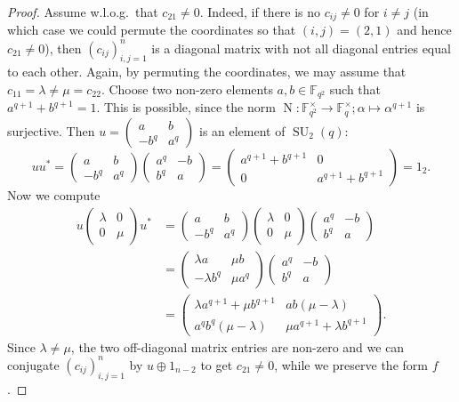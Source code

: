 \documentclass[a4paper,11pt]{amsproc}
\newcommand{\finfield}{\mathbb{F}}%
\DeclareMathOperator{\SU}{SU}%
\DeclareMathOperator{\N}{N}%
\theoremstyle{plain}
\theoremstyle{definition}
\begin{document}
	\begin{proof}
		Assume w.l.o.g.\ that $c_{21}\neq 0$. Indeed, if there is no $c_{ij}\neq 0$ for $i\neq j$ (in which case we could permute the coordinates so that $(i,j)=(2,1)$ and hence $c_{21}\neq 0$), then $(c_{ij})_{i,j=1}^n$ is a diagonal matrix with not all diagonal entries equal to each other. Again, by permuting the coordinates, we may assume that $c_{11}=\lambda\neq\mu=c_{22}$. Choose two non-zero elements $a,b\in\finfield_{q^2}$ such that $a^{q+1}+b^{q+1}=1$. This is possible, since the norm $\N\colon\finfield_{q^2}^\times\to\finfield_q^\times;\alpha\mapsto\alpha^{q+1}$ is surjective. Then $u=\left(\begin{smallmatrix} a & b\\ -b^q & a^q\end{smallmatrix}\right)$ is an element of $\SU_2(q)$: 
		$$
		uu^\ast=\begin{pmatrix} a & b\\ -b^q & a^q\end{pmatrix}\begin{pmatrix} a^q & -b\\ b^q & a\end{pmatrix}=\begin{pmatrix} a^{q+1}+b^{q+1} & 0\\ 0 & a^{q+1}+b^{q+1}\end{pmatrix}=1_2.
		$$
		Now we compute
		\begin{align*}
			u
			\begin{pmatrix}
				\lambda & 0\\
				0 & \mu
			\end{pmatrix}
			u^\ast
			&=
			\begin{pmatrix} 
				a & b\\ 
				-b^q & a^q
			\end{pmatrix}
			\begin{pmatrix}
				\lambda & 0\\
				0 & \mu
			\end{pmatrix}
			\begin{pmatrix} 
				a^q & -b\\ 
				b^q & a
			\end{pmatrix}\\
			&=
			\begin{pmatrix} 
				\lambda a & \mu b\\ 
				-\lambda b^q & \mu a^q
			\end{pmatrix}
			\begin{pmatrix} 
				a^q & -b\\ 
				b^q & a
			\end{pmatrix}\\
			&=
			\begin{pmatrix}
				\lambda a^{q+1}+\mu b^{q+1} & ab(\mu-\lambda)\\
				a^q b^q(\mu-\lambda) & \mu a^{q+1}+\lambda b^{q+1}
			\end{pmatrix}.
		\end{align*}
		Since $\lambda\neq\mu$, the two off-diagonal matrix entries are non-zero and we can conjugate $(c_{ij})_{i,j=1}^n$ by $u\oplus 1_{n-2}$ to get $c_{21}\neq 0$, while we preserve the form $f$.
		

\end{proof}
\end{document}
